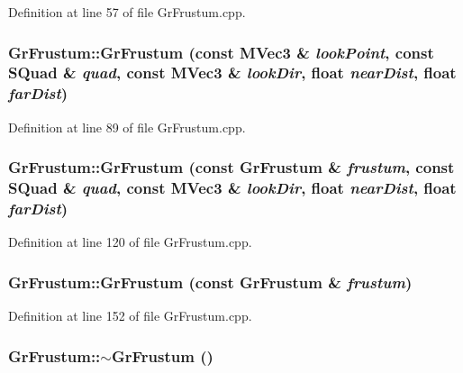 \begin{CompactItemize}
Definition at line 57 of file GrFrustum.cpp.\hypertarget{class_gr_frustum_7b9113897c06cf6ab0fcdc24d47bcde2}{
\subsubsection[{GrFrustum}]{\setlength{\rightskip}{0pt plus 5cm}GrFrustum::GrFrustum (const {\bf MVec3} \& {\em lookPoint}, \/  const {\bf SQuad} \& {\em quad}, \/  const {\bf MVec3} \& {\em lookDir}, \/  float {\em nearDist}, \/  float {\em farDist})}}
\label{class_gr_frustum_7b9113897c06cf6ab0fcdc24d47bcde2}




Definition at line 89 of file GrFrustum.cpp.\hypertarget{class_gr_frustum_b5fc97ae84eef3b86eab19def346ebfc}{
\subsubsection[{GrFrustum}]{\setlength{\rightskip}{0pt plus 5cm}GrFrustum::GrFrustum (const {\bf GrFrustum} \& {\em frustum}, \/  const {\bf SQuad} \& {\em quad}, \/  const {\bf MVec3} \& {\em lookDir}, \/  float {\em nearDist}, \/  float {\em farDist})}}
\label{class_gr_frustum_b5fc97ae84eef3b86eab19def346ebfc}




Definition at line 120 of file GrFrustum.cpp.\hypertarget{class_gr_frustum_d60e52630e16a9d3353027d2d8d21027}{
\subsubsection[{GrFrustum}]{\setlength{\rightskip}{0pt plus 5cm}GrFrustum::GrFrustum (const {\bf GrFrustum} \& {\em frustum})}}
\label{class_gr_frustum_d60e52630e16a9d3353027d2d8d21027}




Definition at line 152 of file GrFrustum.cpp.\hypertarget{class_gr_frustum_c8740aef3cdcf16db377bc346ec2ac75}{
\subsubsection[{$\sim$GrFrustum}]{\setlength{\rightskip}{0pt plus 5cm}GrFrustum::$\sim$GrFrustum ()}}
\label{class_gr_frustum_c8740aef3cdcf16db377bc346ec2ac75}





\end{CompactItemize}

